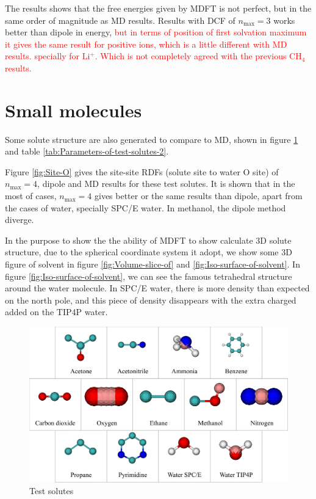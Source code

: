 The results shows that the free energies given by \acs{MDFT} is not
perfect, but in the same order of magnitude as \acs{MD} results.
Results with \acs{DCF} of $n_{\max}=3$ works better than dipole
in energy, \textcolor{red}{but in terms of position of first solvation
maximum it gives the same result for positive ions, which is a little
different with \acs{MD} results. specially for $\mathrm{Li^{+}}$.
Which is not completely agreed with the previous $\mathrm{CH_{4}}$
results.}

\section{Small molecules}

Some solute structure are also generated to compare to \acs{MD},
shown in figure \ref{fig:Test-solutes-2} and table \ref{tab:Parameters-of-test-solutes-2}.

Figure \ref{fig:Site-O} gives the site-site \acs{RDF}s (solute site
to water O site) of $n_{\max}=4$, dipole and \acs{MD} results for
these test solutes. It is shown that in the most of cases, $n_{\max}=4$
gives better or the same results than dipole, apart from the cases
of water, specially SPC/E water. In methanol, the dipole method diverge.

In the purpose to show the the ability of \acs{MDFT} to show calculate
3D solute structure, due to the spherical coordinate system it adopt,
we show some 3D figure of solvent in figure \ref{fig:Volume-slice-of}
and \ref{fig:Iso-surface-of-solvent}. In figure \ref{fig:Iso-surface-of-solvent},
we can see the famous tetrahedral structure around the water molecule.
In SPC/E water, there is more density than expected on the north pole,
and this piece of density disappears with the extra charged added
on the TIP4P water.

\begin{figure}[H]
\begin{centering}
\includegraphics[width=1\columnwidth]{_figure/app_solute_var}
\par\end{centering}
\caption{Test solutes\label{fig:Test-solutes-2}}
\end{figure}

